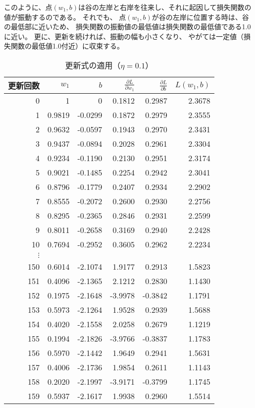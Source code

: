 このように、点$(w_1, b)$は谷の左岸と右岸を往来し、それに起因して損失関数の値が振動するのである。
それでも、
点$(w_1, b)$が谷の左岸に位置する時は、谷の最低部に近いため、
損失関数の振動値の最低値は損失関数の最低値である1.0に近い。
更に、更新を続ければ、振動の幅も小さくなり、
やがては一定値（損失関数の最低値1.0付近）に収束する。

\begin{table}
  \centering
  \begin{tabular}{rrrrrr}
    \toprule
    更新回数 & $w_1$ & $b$ & $\frac{\partial L}{\partial w_1}$ & $\frac{\partial L}{\partial b}$ & $L(w_1, b)$ \\
    \midrule
    0 & 1 & 0 & 0.1812 & 0.2987 & 2.3678 \\
    1 & 0.9819 & -0.0299 & 0.1872 & 0.2979 & 2.3555 \\
    2 & 0.9632 & -0.0597 & 0.1943 & 0.2970 & 2.3431 \\
    3 & 0.9437 & -0.0894 & 0.2028 & 0.2961 & 2.3304 \\
    4 & 0.9234 & -0.1190 & 0.2130 & 0.2951 & 2.3174 \\
    5 & 0.9021 & -0.1485 & 0.2254 & 0.2942 & 2.3041 \\
    6 & 0.8796 & -0.1779 & 0.2407 & 0.2934 & 2.2902 \\
    7 & 0.8555 & -0.2072 & 0.2600 & 0.2930 & 2.2756 \\
    8 & 0.8295 & -0.2365 & 0.2846 & 0.2931 & 2.2599 \\
    9 & 0.8011 & -0.2658 & 0.3169 & 0.2940 & 2.2428 \\
    10 & 0.7694 & -0.2952 & 0.3605 & 0.2962 & 2.2234 \\
    $\vdots$ &&&&&\\
    150 & 0.6014 & -2.1074 & 1.9177 & 0.2913 & 1.5823 \\
    151 & 0.4096 & -2.1365 & 2.1212 & 0.2830 & 1.1430 \\
    152 & 0.1975 & -2.1648 & -3.9978 & -0.3842 & 1.1791 \\
    153 & 0.5973 & -2.1264 & 1.9528 & 0.2939 & 1.5688 \\
    154 & 0.4020 & -2.1558 & 2.0258 & 0.2679 & 1.1219 \\
    155 & 0.1994 & -2.1826 & -3.9766 & -0.3837 & 1.1783 \\
    156 & 0.5970 & -2.1442 & 1.9649 & 0.2941 & 1.5631 \\
    157 & 0.4006 & -2.1736 & 1.9854 & 0.2611 & 1.1143 \\
    158 & 0.2020 & -2.1997 & -3.9171 & -0.3799 & 1.1745 \\
    159 & 0.5937 & -2.1617 & 1.9938 & 0.2960 & 1.5514 \\
    \bottomrule
  \end{tabular}
  \caption{更新式の適用（$\eta = 0.1$）}
  \label{tab:update-lr-0.1}
\end{table}

